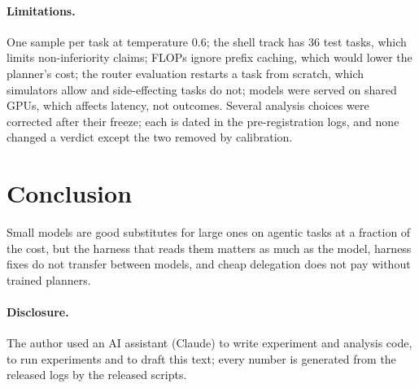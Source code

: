 \paragraph{Limitations.} One sample per task at temperature 0.6; the shell track has 36 test tasks, which limits
non-inferiority claims; FLOPs ignore prefix caching, which would lower the planner's cost; the router evaluation
restarts a task from scratch, which simulators allow and side-effecting tasks do not; models were served on shared
GPUs, which affects latency, not outcomes. Several analysis choices were corrected after their freeze; each is
dated in the pre-registration logs, and none changed a verdict except the two removed by calibration.

\section{Conclusion}

Small models are good substitutes for large ones on agentic tasks at a fraction of the cost, but the harness that
reads them matters as much as the model, harness fixes do not transfer between models, and cheap delegation does
not pay without trained planners. \release

\paragraph{Disclosure.} The author used an AI assistant (Claude) to write experiment and analysis code, to run
experiments and to draft this text; every number is generated from the released logs by the released scripts.
